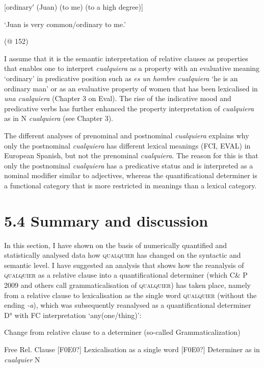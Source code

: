   [ordinary′ (Juan) (to me) (to a high degree)]  

  ‘Juan is very common/ordinary to me.’  

    (@ 152)

I assume that it is the semantic interpretation of relative clauses as properties that enables one to interpret \textit{cualquiera} as a property with an evaluative meaning ‘ordinary’ in predicative position such as \textit{es un hombre cualquiera} ‘he is an ordinary man’ or as an evaluative property of women that has been lexicalised in \textit{una cualquiera} (Chapter 3 on Eval). The rise of the indicative mood and predicative verbs has further enhanced the property interpretation of \textit{cualquiera} as in N \textit{cualquiera} (see Chapter 3). 

  The different analyses of prenominal and postnominal \textit{cualquiera} explains why only the postnominal \textit{cualquiera} has different lexical meanings (FCI, EVAL) in European Spanish, but not the prenominal \textit{cualquiera}. The reason for this is that only the postnominal \textit{cualquiera} has a predicative status and is interpreted as a nominal modifier similar to adjectives, whereas the quantificational determiner is a functional category that is more restricted in meanings than a lexical category.

\section{\textbf{5.4} \textbf{Summary} \textbf{and} \textbf{discussion}}

In this section, I have shown on the basis of numerically quantified and statistically analysed data how \textsc{qualquier} has changed on the syntactic and semantic level. I have suggested an analysis that shows how the reanalysis of \textsc{qualquier} as a relative clause into a quantificational determiner (which C\& P 2009 and others call grammaticalisation of \textsc{qualquier}) has taken place, namely from a relative clause to lexicalisation as the single word \textsc{qualquier} (without the ending \textit{{}-a}), which was subsequently reanalysed as a quantificational determiner D° with FC interpretation ‘any(one/thing)’:

  Change from relative clause to a determiner (so-called Grammaticalization)

    Free Rel. Clause [F0E0?] Lexicalisation as a single word [F0E0?] Determiner as in \textit{cualquier} N


